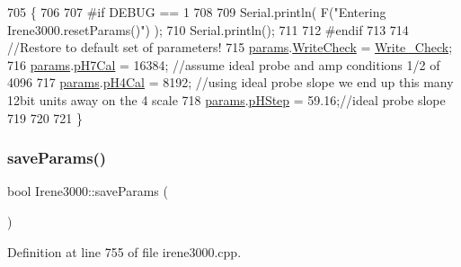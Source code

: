 \begin{DoxyCode}
705 \{
706 
707 \textcolor{preprocessor}{#if DEBUG == 1 }
708 
709     Serial.println( F(\textcolor{stringliteral}{"Entering Irene3000.resetParams()"}) );
710     Serial.println();
711 
712 \textcolor{preprocessor}{#endif }
713 
714     \textcolor{comment}{//Restore to default set of parameters!}
715     \hyperlink{class_irene3000_a136585a5ee7f9ac6ab52175fa153f8e3}{params}.\hyperlink{struct_irene3000_1_1parameters___t_a56f1f14d33a69300d580eda2dc52cecd}{WriteCheck} = \hyperlink{_irene3000_8h_a9fa3b8fd890fde289060ee254cd273d5}{Write\_Check};
716     \hyperlink{class_irene3000_a136585a5ee7f9ac6ab52175fa153f8e3}{params}.\hyperlink{struct_irene3000_1_1parameters___t_a21265466a570d84bff914f26d2f7a03e}{pH7Cal} = 16384; \textcolor{comment}{//assume ideal probe and amp conditions 1/2 of 4096}
717     \hyperlink{class_irene3000_a136585a5ee7f9ac6ab52175fa153f8e3}{params}.\hyperlink{struct_irene3000_1_1parameters___t_a1144de6fb54eb3e1dd2a3d8c2afc97dc}{pH4Cal} = 8192; \textcolor{comment}{//using ideal probe slope we end up this many 12bit units away on the
       4 scale}
718     \hyperlink{class_irene3000_a136585a5ee7f9ac6ab52175fa153f8e3}{params}.\hyperlink{struct_irene3000_1_1parameters___t_a61cfcc2539d5f630e9071f3753aba9fe}{pHStep} = 59.16;\textcolor{comment}{//ideal probe slope}
719 
720 
721 \}
\end{DoxyCode}
\mbox{\label{class_irene3000_a63dbd38e79b8cd5f1fba4b245501a894}} 
\subsubsection{\texorpdfstring{save\+Params()}{saveParams()}}
{\footnotesize\ttfamily bool Irene3000\+::save\+Params (\begin{DoxyParamCaption}{ }\end{DoxyParamCaption})}



Definition at line 755 of file irene3000.\+cpp.


